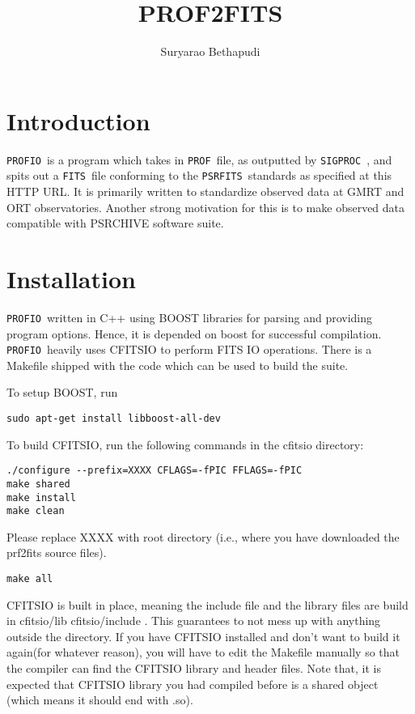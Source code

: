 \documentclass{article}
\newcommand{\prf}{\texttt{PROFIO}\ }
\newcommand{\prof}{\texttt{PROF}\ }
\newcommand{\sigproc}{\texttt{SIGPROC}\ }
\newcommand{\fits}{\texttt{FITS}\ }
\newcommand{\psrfits}{\texttt{PSRFITS}\ }
\begin{document}


\title{PROF2FITS}
\date{}
\author{Suryarao Bethapudi}
\maketitle
\section*{\hfill Introduction}

\par \prf is a program which takes in \prof file, as outputted by \sigproc, and spits out a \fits file conforming to the \psrfits standards as specified at this HTTP URL. It is primarily written to standardize observed data at GMRT and ORT observatories. Another strong motivation for this is to make observed data compatible with PSRCHIVE software suite. 

\section*{\hfill Installation}

\par \prf written in C++ using BOOST libraries for parsing and providing program options. Hence, it is depended on boost for successful compilation. \prf heavily uses CFITSIO to perform FITS IO operations. There is a Makefile shipped with the code which can be used to build the suite. 

\par To setup BOOST, run 
\begin{lstlisting}
sudo apt-get install libboost-all-dev
\end{lstlisting}
\par To build CFITSIO, run the following commands in the cfitsio directory:  
\begin{lstlisting}
./configure --prefix=XXXX CFLAGS=-fPIC FFLAGS=-fPIC
make shared 
make install
make clean
\end{lstlisting}
Please replace XXXX with root directory (i.e., where you have downloaded the prf2fits source files). 
\begin{lstlisting}
make all 
\end{lstlisting}
\par CFITSIO is built in place, meaning the include file and the library files are build in cfitsio/lib cfitsio/include . This guarantees to not mess up with anything outside the directory. If you have CFITSIO installed and don't want to build it again(for whatever reason), you will have to edit the Makefile manually so that the compiler can find the CFITSIO library and header files. Note that, it is expected that CFITSIO library you had compiled before is a shared object (which means it should end with .so). 
\end{document}
